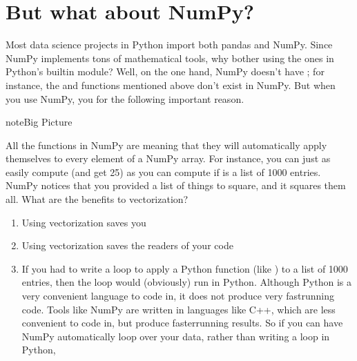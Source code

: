 \documentclass[letterpaper,10pt,english]{sphinxmanual}
\begin{document}
\section{But what about NumPy?}
\label{\detokenize{chapter-9-math-and-stats:but-what-about-numpy}}
Most data science projects in Python import both pandas and NumPy.  Since NumPy implements tons of mathematical tools, why bother using the ones in Python’s built\sphinxhyphen{}in  module?  Well, on the one hand, NumPy doesn’t have ; for instance, the  and  functions mentioned above don’t exist in NumPy.  But when you  use NumPy, you  for the following important reason.

\begin{sphinxadmonition}{note}{Big Picture}

All the functions in NumPy are  meaning that they will automatically apply themselves to every element of a NumPy array.  For instance, you can just as easily compute  (and get 25) as you can compute  if  is a list of 1000 entries.  NumPy notices that you provided a list of things to square, and it squares them all.  What are the benefits to vectorization?
\begin{enumerate}
%
\item {} 
Using vectorization saves you 

\item {} 
Using vectorization saves the readers of your code 

\item {} 
If you had to write a loop to apply a Python function (like ) to a list of 1000 entries, then the loop would (obviously) run in Python.  Although Python is a very convenient language to code in, it does not produce very fast\sphinxhyphen{}running code.  Tools like NumPy are written in languages like C++, which are less convenient to code in, but produce faster\sphinxhyphen{}running results.  So if you can have NumPy automatically loop over your data, rather than writing a loop in Python, 

\end{enumerate}
\end{sphinxadmonition}
\end{document}
